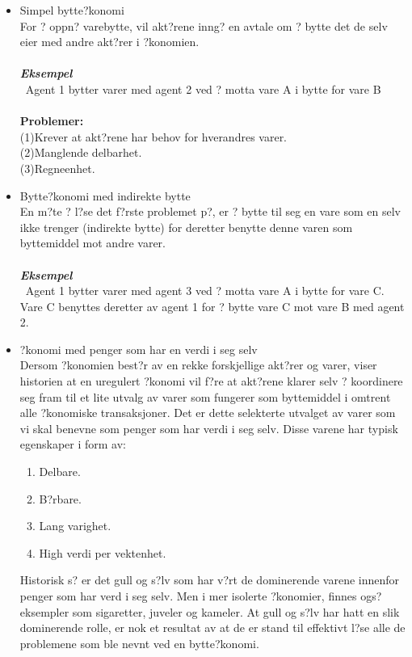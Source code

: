 \documentclass[a4paper,notitlepage]{article}
\begin{document}
\begin{itemize}
\item Simpel bytte?konomi\\
For ? oppn? varebytte, vil akt?rene inng? en avtale om ? bytte det de selv eier med andre akt?rer i ?konomien.\\
\noindent\textbf{\emph{\\ Eksempel}}\\\
Agent 1 bytter varer med agent 2 ved ? motta vare A i bytte for vare B\\
\noindent\textbf{\\ Problemer:}\\
(1)Krever at akt?rene har behov for hverandres varer. \\
(2)Manglende delbarhet. \\
(3)Regneenhet.
\item Bytte?konomi med indirekte bytte\\
En m?te ? l?se det f?rste problemet p?, er ? bytte til seg en vare som en selv ikke trenger (indirekte bytte) for deretter benytte denne varen som byttemiddel mot andre varer.\\
\noindent\textbf{\emph{\\ Eksempel}}\\\
Agent 1 bytter varer med agent 3 ved ? motta vare A i bytte for vare C. Vare C benyttes deretter av agent 1 for ? bytte vare C mot vare B med agent 2.
\item ?konomi med penger som har en verdi i seg selv\\
Dersom ?konomien best?r av en rekke forskjellige akt?rer og varer, viser historien at en uregulert ?konomi vil f?re at akt?rene klarer selv ? koordinere seg fram til et lite utvalg av varer som fungerer som byttemiddel i omtrent alle ?konomiske transaksjoner. Det er dette selekterte utvalget av varer som vi skal benevne som penger som har verdi i seg selv. Disse varene har typisk egenskaper i form av:
\begin{enumerate}
\item Delbare.
\item B?rbare.
\item Lang varighet.
\item High verdi per vektenhet.
\end{enumerate}
Historisk s? er det gull og s?lv som har v?rt de dominerende varene innenfor penger som har verd i seg selv. Men i mer isolerte ?konomier, finnes ogs? eksempler som sigaretter, juveler og kameler. At gull og s?lv har hatt en slik dominerende rolle, er nok et resultat av at de er stand til effektivt l?se alle de problemene som ble nevnt ved en bytte?konomi.

\end{itemize}
\end{document}
